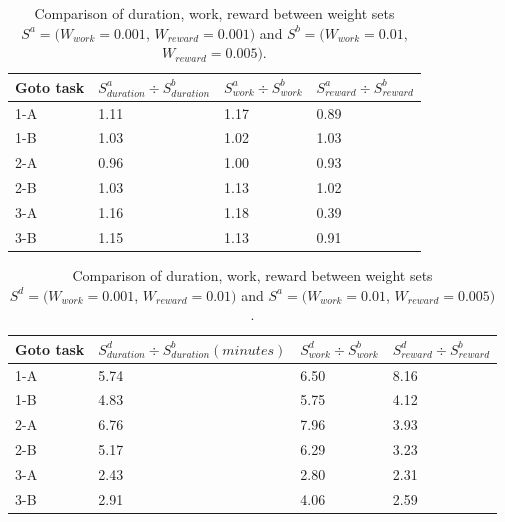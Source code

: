 \documentclass{tamuccthesis}
\begin{document}
\begin{table}[H]
    \begin{tabular}{|l|l|l|l|}
        \hline
        Goto task & $S^a_{duration} \div S^b_{duration}$ & $S^a_{work} \div S^b_{work}$ & $S^a_{reward} \div S^b_{reward}$ \\
        \hline
        1-A & 1.11 & 1.17 & 0.89 \\
        \hline
        1-B & 1.03 & 1.02 & 1.03 \\
        \hline
        2-A & 0.96 & 1.00 & 0.93 \\
        \hline
        2-B & 1.03 & 1.13 & 1.02 \\
        \hline
        3-A & 1.16 & 1.18 & 0.39 \\
        \hline
        3-B &  1.15 & 1.13 & 0.91 \\
        \hline
    \end{tabular}
    \caption[Varying optimization criteria weights, weight sets $S^a$ and $S^b$.]{Comparison of duration, work, reward between weight sets $S^a = (W_{work} = 0.001$, $W_{reward} = 0.001)$ and $S^b = (W_{work} = 0.01$, $W_{reward} = 0.005)$.}
    \label{tbl:weightDiff_a_b}
\end{table}

\begin{table}[H]
    \begin{tabular}{|l|l|l|l|}
        \hline
        Goto task & $S^d_{duration} \div S^b_{duration} (minutes)$ & $S^d_{work} \div S^b_{work}$ & $S^d_{reward} \div S^b_{reward}$ \\
        \hline
        1-A & 5.74 & 6.50 & 8.16 \\
        \hline
        1-B & 4.83 & 5.75 & 4.12 \\
        \hline
        2-A & 6.76 & 7.96 & 3.93 \\
        \hline
        2-B & 5.17 & 6.29 & 3.23 \\
        \hline
        3-A & 2.43 & 2.80 & 2.31 \\
        \hline
        3-B & 2.91 & 4.06 & 2.59 \\
        \hline
    \end{tabular}
    \caption[Varying optimization criteria weights, weight sets $S^d$ and $S^b$.]{Comparison of duration, work, reward between weight sets $S^d = (W_{work} = 0.001$, $W_{reward} = 0.01)$ and $S^a = (W_{work} = 0.01$, $W_{reward} = 0.005)$.}
    \label{tbl:weightDiff_d_b}
\end{table}
\end{document}
